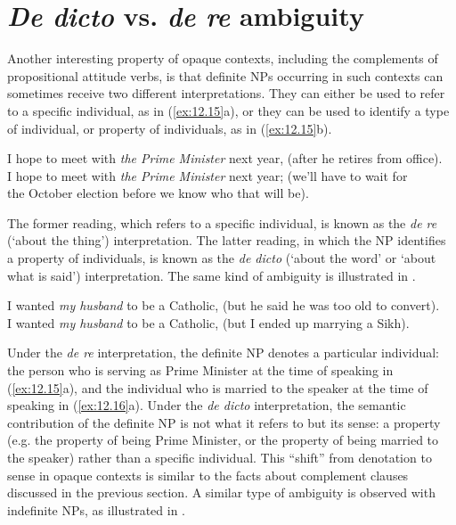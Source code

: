 \section{\textit{De dicto} vs. \textit{de re} ambiguity}\label{sec:12.5}

Another interesting property of opaque contexts, including the complements of propositional attitude verbs, is that definite NPs occurring in such contexts can sometimes receive two different interpretations. They can either be used to refer to a specific individual, as in (\ref{ex:12.15}a), or they can be used to identify a type of individual, or property of individuals, as in (\ref{ex:12.15}b).


\ea \label{ex:12.15}
\ea I hope to meet with \textit{the Prime Minister} next year, (after he retires from office).\\
\ex I hope to meet with \textit{the Prime Minister} next year; (we’ll have to wait for\\
  the October election before we know who that will be).
                       \z
\z


The former reading, which refers to a specific individual, is known as the \textit{de re} (‘about the thing’) interpretation. The latter reading, in which the NP identifies a property of individuals, is known as the \textit{de dicto} (‘about the word’ or ‘about what is said’) interpretation. The same kind of ambiguity is illustrated in .


\ea \label{ex:12.16}
\ea I wanted \textit{my husband} to be a Catholic, (but he said he was too old to convert).\\
\ex I wanted \textit{my husband} to be a Catholic, (but I ended up marrying a Sikh).
                       \z
\z


Under the \textit{de re} interpretation, the definite NP denotes a particular individual: the person who is serving as Prime Minister at the time of speaking in (\ref{ex:12.15}a), and the individual who is married to the speaker at the time of speaking in (\ref{ex:12.16}a). Under the \textit{de dicto} interpretation, the semantic contribution of the definite NP is not what it refers to but its sense: a property (e.g. the property of being Prime Minister, or the property of being married to the speaker) rather than a specific individual. This “shift” from denotation to sense in opaque contexts is similar to the facts about complement clauses discussed in the previous section. A similar type of ambiguity is observed with indefinite NPs, as illustrated in .


